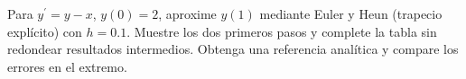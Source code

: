 Para $y^{\prime}=y-x$, $y(0)=2$, aproxime $y(1)$ mediante Euler y Heun (trapecio explícito) con $h=0.1$. Muestre los dos primeros pasos y complete la tabla sin redondear resultados intermedios. Obtenga una referencia analítica y compare los errores en el extremo.
